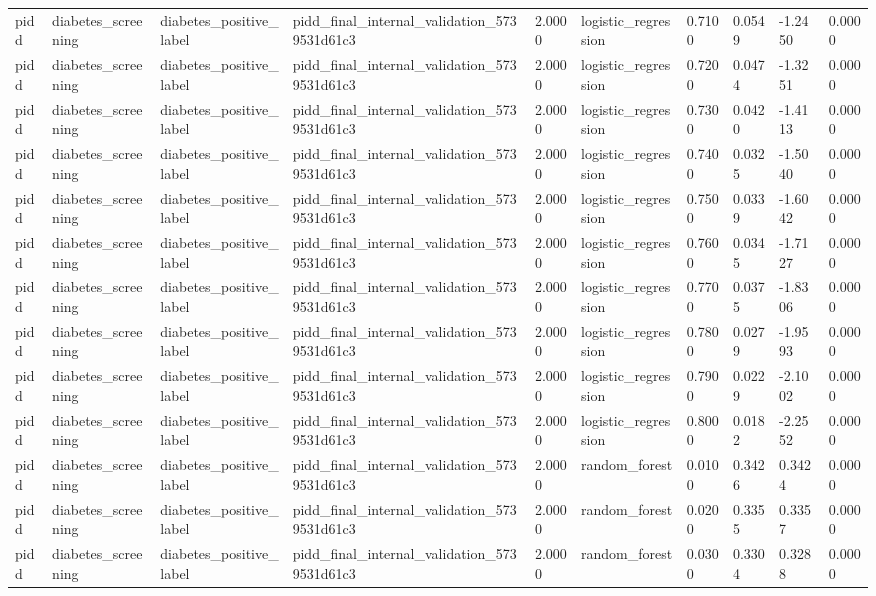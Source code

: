\begin{tabular}{llllllllll}
pidd & diabetes\_screening & diabetes\_positive\_label & pidd\_final\_internal\_validation\_5739531d61c3 & 2.0000 & logistic\_regression & 0.7100 & 0.0549 & -1.2450 & 0.0000 \\
pidd & diabetes\_screening & diabetes\_positive\_label & pidd\_final\_internal\_validation\_5739531d61c3 & 2.0000 & logistic\_regression & 0.7200 & 0.0474 & -1.3251 & 0.0000 \\
pidd & diabetes\_screening & diabetes\_positive\_label & pidd\_final\_internal\_validation\_5739531d61c3 & 2.0000 & logistic\_regression & 0.7300 & 0.0420 & -1.4113 & 0.0000 \\
pidd & diabetes\_screening & diabetes\_positive\_label & pidd\_final\_internal\_validation\_5739531d61c3 & 2.0000 & logistic\_regression & 0.7400 & 0.0325 & -1.5040 & 0.0000 \\
pidd & diabetes\_screening & diabetes\_positive\_label & pidd\_final\_internal\_validation\_5739531d61c3 & 2.0000 & logistic\_regression & 0.7500 & 0.0339 & -1.6042 & 0.0000 \\
pidd & diabetes\_screening & diabetes\_positive\_label & pidd\_final\_internal\_validation\_5739531d61c3 & 2.0000 & logistic\_regression & 0.7600 & 0.0345 & -1.7127 & 0.0000 \\
pidd & diabetes\_screening & diabetes\_positive\_label & pidd\_final\_internal\_validation\_5739531d61c3 & 2.0000 & logistic\_regression & 0.7700 & 0.0375 & -1.8306 & 0.0000 \\
pidd & diabetes\_screening & diabetes\_positive\_label & pidd\_final\_internal\_validation\_5739531d61c3 & 2.0000 & logistic\_regression & 0.7800 & 0.0279 & -1.9593 & 0.0000 \\
pidd & diabetes\_screening & diabetes\_positive\_label & pidd\_final\_internal\_validation\_5739531d61c3 & 2.0000 & logistic\_regression & 0.7900 & 0.0229 & -2.1002 & 0.0000 \\
pidd & diabetes\_screening & diabetes\_positive\_label & pidd\_final\_internal\_validation\_5739531d61c3 & 2.0000 & logistic\_regression & 0.8000 & 0.0182 & -2.2552 & 0.0000 \\
pidd & diabetes\_screening & diabetes\_positive\_label & pidd\_final\_internal\_validation\_5739531d61c3 & 2.0000 & random\_forest & 0.0100 & 0.3426 & 0.3424 & 0.0000 \\
pidd & diabetes\_screening & diabetes\_positive\_label & pidd\_final\_internal\_validation\_5739531d61c3 & 2.0000 & random\_forest & 0.0200 & 0.3355 & 0.3357 & 0.0000 \\
pidd & diabetes\_screening & diabetes\_positive\_label & pidd\_final\_internal\_validation\_5739531d61c3 & 2.0000 & random\_forest & 0.0300 & 0.3304 & 0.3288 & 0.0000 \\

\end{tabular}
